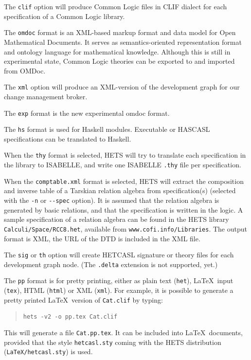 \documentclass{article}
\newcommand{\normalTEXTSC}[2]{{#1\scriptsize#2}}
\newcommand     {\Hets}{\normalTEXTSC{H}{ETS}\xspace}
\newcommand     {\Isabelle}{\normalTEXTSC{I}{SABELLE}\xspace}
\newcommand     {\HasCASL}{\normalTEXTSC{H}{AS}\normalTEXTSC{C}{ASL}\xspace}
\newcommand{\HetCASL}{\normalTEXTSC{H}{ET}\normalTEXTSC{C}{ASL}\xspace}
\begin{document}
\begin{description}
The \texttt{clif} option will produce Common Logic files in
CLIF dialect for each specification of a Common Logic library.

The \texttt{omdoc} format \cite{books/sp/Kohlhase06} is an XML-based
markup format and data model for Open Mathematical Documents. It
serves as semantics-oriented representation format and ontology
language for mathematical knowledge. Although this is still in experimental 
state, Common Logic theories can be exported to and imported from OMDoc.

The \texttt{xml} option will produce an XML-version of the development graph
for our change management broker.

The \texttt{exp} format is the new experimental omdoc format.

The \texttt{hs} format is used for Haskell modules. Executable \CASL or
\HasCASL specifications can be translated to Haskell.

When the \texttt{thy} format is selected, \Hets will try to translate
each specification in the library to \Isabelle, and write one \Isabelle
\texttt{.thy} file per specification.

When the \texttt{comptable.xml} format is selected, \Hets will extract
the composition and inverse table of a Tarskian relation algebra from
specification(s) (selected with the \texttt{-n} or \texttt{-{}-spec}
option). It is assumed that the relation algebra is
generated by basic relations, and that the specification is written
in the \CASL logic. A sample specification of a relation
algebra can be found in the \Hets library \texttt{Calculi/Space/RCC8.het},
available from \texttt{www.cofi.info/Libraries}.
The output format is XML, the URL of the DTD is included in the
XML file.

The \texttt{sig} or \texttt{th} option will create \HetCASL signature or
theory files for each development graph node. (The \texttt{.delta} extension
is not supported, yet.)

The \texttt{pp} format is for pretty printing, either as plain text
(\texttt{het}), \LaTeX\ input (\texttt{tex}), HTML (\texttt{html}) or XML
(\texttt{xml}).  For example, it is possible to generate a pretty printed
\LaTeX\ version of \texttt{Cat.clif} by typing:

\begin{quote}
\texttt{hets -v2 -o pp.tex Cat.clif}
\end{quote}

This will generate a file \texttt{Cat.pp.tex}. It can be included
into \LaTeX\ documents, provided that the style \texttt{hetcasl.sty}
coming with the \Hets distribution (\texttt{LaTeX/hetcasl.sty}) is used.


\end{description}
\end{document}
